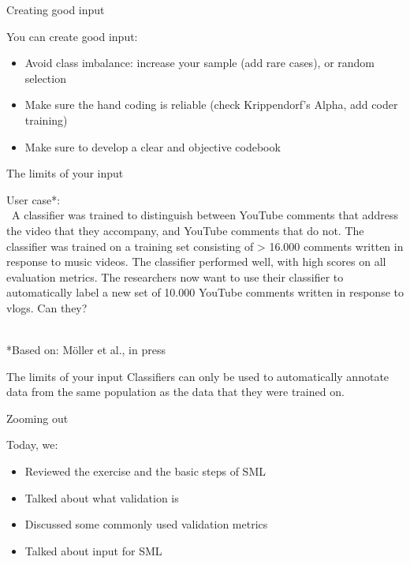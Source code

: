 \documentclass[compress]{beamer}
\begin{document}
\begin{frame}[fragile]{Creating good input}
\begin{alertblock}{You can create good input:}
	\begin{itemize}
		\item Avoid class imbalance: increase your sample (add rare cases), or random selection %
		\item Make sure the hand coding is reliable (check Krippendorf's Alpha, add coder training) %
		\item Make sure to develop a clear and objective codebook %
	\end{itemize}
\end{alertblock}
\end{frame}


\begin{frame}[fragile]{The limits of your input}

User case*: \\\
A classifier was trained to distinguish between YouTube comments that address the video that they accompany, and YouTube comments that do not.
\pause
The classifier was trained on a training set consisting of > 16.000 comments written in response to music videos.
\pause
The classifier performed well, with high scores on all evaluation metrics.
\pause
The researchers now want to use their classifier to automatically label a new set of 10.000 YouTube comments written in response to vlogs.
\pause
Can they? \\\

\begin{tiny}
*Based on: Möller et al., in press
\end{tiny}
\end{frame}

\begin{frame}[fragile]{The limits of your input}
Classifiers can only be used to automatically annotate data from the same population as the data that they were trained on.
\end{frame}


\begin{frame}[fragile]{Zooming out} 
	
\begin{alertblock}{Today, we:}
\begin{itemize}
	\item Reviewed the exercise and the basic steps of SML
	\item Talked about what validation is
	\item Discussed some commonly used validation metrics
	\item Talked about input for SML
\end{itemize}
\end{alertblock}
	
\end{frame}
\end{document}
